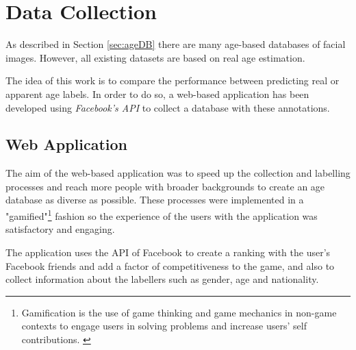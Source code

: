 \chapter{Data Collection} \label{chap:data}

As described in Section \ref{sec:ageDB} there are many age-based databases of facial images. However, all existing datasets are based on real age estimation. 

The idea of this work is to compare the performance between predicting real or apparent age labels. In order to do so, a web-based application has been developed using \textit{Facebook's API} to collect a database with these annotations.


\section{Web Application}

The aim of the web-based application was to speed up the collection and labelling processes and reach more people with broader backgrounds to create an age database as diverse as possible. These processes were implemented in a "gamified"\footnote{Gamification is the use of game thinking and game mechanics in non-game contexts to engage users in solving problems and increase users' self contributions. \cite{Deterding:2011:GDE:2181037.2181040}} fashion so the experience of the users with the application was satisfactory and engaging. 

The application uses the API of Facebook to create a ranking with the user's Facebook friends and add a factor of competitiveness to the game, and also to collect information about the labellers such as gender, age and nationality.


